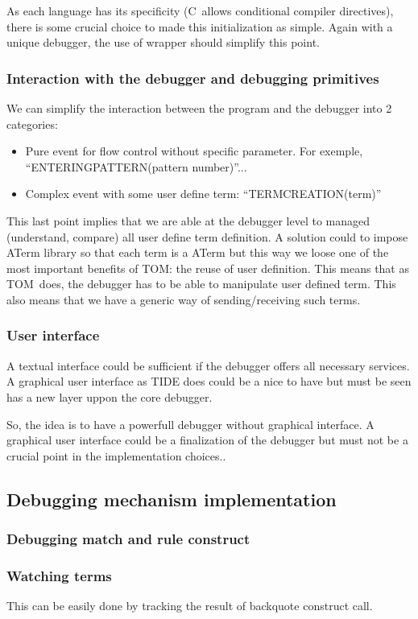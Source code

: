 \documentclass[a4paper]{article}
\newcommand{\TOM}{\textsf{TOM}}
\newcommand{\C}{\textsf{C}}
\begin{document}
As each language has its specificity (\C\ allows conditional compiler
directives), there is some crucial choice to made this initialization
as simple.
Again with a unique debugger, the use of wrapper should simplify this point.

\subsubsection{Interaction with the debugger and debugging primitives}
We can simplify the interaction between the program and the debugger
into 2 categories:
\begin{itemize}
\item Pure event for flow control without specific parameter. For
  exemple, ``ENTERINGPATTERN(pattern number)''...
\item Complex event with some user define term: ``TERMCREATION(term)''
\end{itemize}
This last point implies that we are able at the debugger level to
managed (understand, compare) all user define term definition. A
solution could to impose ATerm library so that each term is a ATerm
but this way we loose one of the most important benefits of \TOM: the
reuse of user definition. This means that as \TOM\ does, the debugger
has to be able to manipulate user defined term. This also means that
we have a generic way of sending/receiving such terms.

\subsubsection{User interface}
A textual interface could be sufficient if the debugger offers all
necessary services. A graphical user interface as TIDE does could be a
nice to have but must be seen has a new layer uppon the core debugger.

So, the idea is to have a powerfull debugger without graphical
interface. A graphical user interface could be a finalization of the
debugger but must not be a crucial point in the implementation choices..

\subsection{Debugging mechanism implementation}

\subsubsection{Debugging match and rule construct}

\subsubsection{Watching terms}
This can be easily done by tracking the result of backquote construct call.
\end{document}
